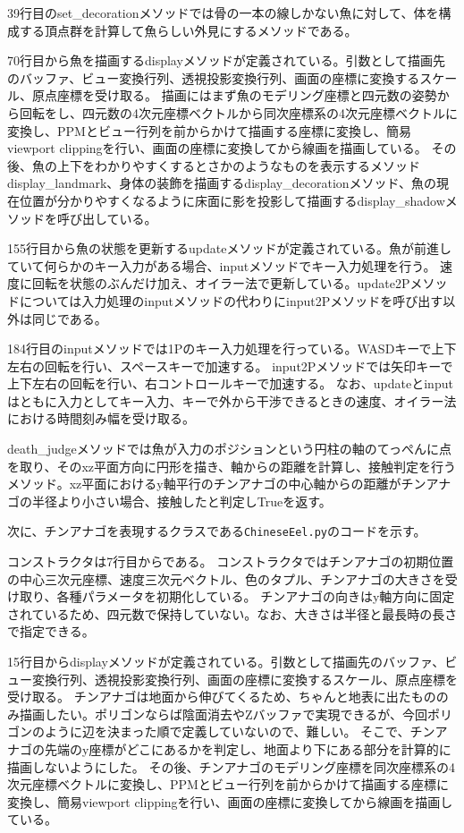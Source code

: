 \documentclass[uplatex,dvipdfmx]{jsarticle}
\begin{document}
39行目のset\_decorationメソッドでは骨の一本の線しかない魚に対して、体を構成する頂点群を計算して魚らしい外見にするメソッドである。

70行目から魚を描画するdisplayメソッドが定義されている。引数として描画先のバッファ、ビュー変換行列、透視投影変換行列、画面の座標に変換するスケール、原点座標を受け取る。
描画にはまず魚のモデリング座標と四元数の姿勢から回転をし、四元数の4次元座標ベクトルから同次座標系の4次元座標ベクトルに変換し、PPMとビュー行列を前からかけて描画する座標に変換し、簡易viewport clippingを行い、画面の座標に変換してから線画を描画している。
その後、魚の上下をわかりやすくするとさかのようなものを表示するメソッドdisplay\_landmark、身体の装飾を描画するdisplay\_decorationメソッド、魚の現在位置が分かりやすくなるように床面に影を投影して描画するdisplay\_shadowメソッドを呼び出している。

155行目から魚の状態を更新するupdateメソッドが定義されている。魚が前進していて何らかのキー入力がある場合、inputメソッドでキー入力処理を行う。
速度に回転を状態のぶんだけ加え、オイラー法で更新している。update2Pメソッドについては入力処理のinputメソッドの代わりにinput2Pメソッドを呼び出す以外は同じである。

184行目のinputメソッドでは1Pのキー入力処理を行っている。WASDキーで上下左右の回転を行い、スペースキーで加速する。
input2Pメソッドでは矢印キーで上下左右の回転を行い、右コントロールキーで加速する。
なお、updateとinputはともに入力としてキー入力、キーで外から干渉できるときの速度、オイラー法における時間刻み幅を受け取る。

death\_judgeメソッドでは魚が入力のポジションという円柱の軸のてっぺんに点を取り、そのxz平面方向に円形を描き、軸からの距離を計算し、接触判定を行うメソッド。xz平面におけるy軸平行のチンアナゴの中心軸からの距離がチンアナゴの半径より小さい場合、接触したと判定しTrueを返す。



次に、チンアナゴを表現するクラスである\verb|ChineseEel.py|のコードを示す。

コンストラクタは7行目からである。
コンストラクタではチンアナゴの初期位置の中心三次元座標、速度三次元ベクトル、色のタプル、チンアナゴの大きさを受け取り、各種パラメータを初期化している。
チンアナゴの向きはy軸方向に固定されているため、四元数で保持していない。なお、大きさは半径と最長時の長さで指定できる。

15行目からdisplayメソッドが定義されている。引数として描画先のバッファ、ビュー変換行列、透視投影変換行列、画面の座標に変換するスケール、原点座標を受け取る。
チンアナゴは地面から伸びてくるため、ちゃんと地表に出たもののみ描画したい。ポリゴンならば陰面消去やZバッファで実現できるが、今回ポリゴンのように辺を決まった順で定義していないので、難しい。
そこで、チンアナゴの先端のy座標がどこにあるかを判定し、地面より下にある部分を計算的に描画しないようにした。
その後、チンアナゴのモデリング座標を同次座標系の4次元座標ベクトルに変換し、PPMとビュー行列を前からかけて描画する座標に変換し、簡易viewport clippingを行い、画面の座標に変換してから線画を描画している。
\end{document}
